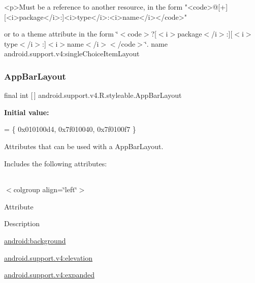 \begin{DoxyVerb}      <p>Must be a reference to another resource, in the form "<code>@[+][<i>package</i>:]<i>type</i>:<i>name</i></code>"
\end{DoxyVerb}
 or to a theme attribute in the form \char`\"{}$<$code$>$?\mbox{[}$<$i$>$package$<$/i$>$\+:\mbox{]}\mbox{[}$<$i$>$type$<$/i$>$\+:\mbox{]}$<$i$>$name$<$/i$>$$<$/code$>$\char`\"{}.  name android.\+support.\+v4\+:single\+Choice\+Item\+Layout \mbox{\label{classandroid_1_1support_1_1v4_1_1R_1_1styleable_aa7c4e9c9d1655572bf8e4bfd804025c2}} 
\subsubsection{\texorpdfstring{App\+Bar\+Layout}{AppBarLayout}}
{\footnotesize\ttfamily final int \mbox{[}$\,$\mbox{]} android.\+support.\+v4.\+R.\+styleable.\+App\+Bar\+Layout\hspace{0.3cm}{\ttfamily [static]}}

{\bfseries Initial value\+:}
\begin{DoxyCode}
= \{
            0x010100d4, 0x7f010040, 0x7f0100f7
        \}
\end{DoxyCode}
Attributes that can be used with a App\+Bar\+Layout. 

Includes the following attributes\+:

\tabulinesep=1mm
\begin{longtabu} spread 0pt [c]{*{0}{|X[-1]}|}
\hline
\end{longtabu}
$<$colgroup align=\char`\"{}left\char`\"{}$>$ 

Attribute

Description 

{\ttfamily \hyperlink{classandroid_1_1support_1_1v4_1_1R_1_1styleable_a466e2c25659363526699f5b8c84819f2}{android\+:background}}

{\ttfamily \hyperlink{classandroid_1_1support_1_1v4_1_1R_1_1styleable_a40cbdffd2cc9c9fdad7adeb8bc114b8d}{android.\+support.\+v4\+:elevation}}

{\ttfamily \hyperlink{classandroid_1_1support_1_1v4_1_1R_1_1styleable_a2cbf1a78895b2153260cecf4522cd109}{android.\+support.\+v4\+:expanded}}

